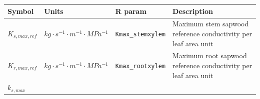 \documentclass[]{book}
\begin{document}
\begin{longtable}[]{@{}llll@{}}
\toprule
\begin{minipage}[b]{0.11\columnwidth}\raggedright\strut
Symbol\strut
\end{minipage} & \begin{minipage}[b]{0.10\columnwidth}\raggedright\strut
Units\strut
\end{minipage} & \begin{minipage}[b]{0.12\columnwidth}\raggedright\strut
R param\strut
\end{minipage} & \begin{minipage}[b]{0.45\columnwidth}\raggedright\strut
Description\strut
\end{minipage}\tabularnewline
\midrule
\endhead
\begin{minipage}[t]{0.11\columnwidth}\raggedright\strut
\(K_{s,max,ref}\)\strut
\end{minipage} & \begin{minipage}[t]{0.10\columnwidth}\raggedright\strut
\(kg \cdot s^{-1} \cdot m^{-1} \cdot MPa^{-1}\)\strut
\end{minipage} & \begin{minipage}[t]{0.12\columnwidth}\raggedright\strut
\texttt{Kmax\_stemxylem}\strut
\end{minipage} & \begin{minipage}[t]{0.45\columnwidth}\raggedright\strut
Maximum stem sapwood reference conductivity per leaf area unit\strut
\end{minipage}\tabularnewline
\begin{minipage}[t]{0.11\columnwidth}\raggedright\strut
\(K_{r,max,ref}\)\strut
\end{minipage} & \begin{minipage}[t]{0.10\columnwidth}\raggedright\strut
\(kg \cdot s^{-1} \cdot m^{-1} \cdot MPa^{-1}\)\strut
\end{minipage} & \begin{minipage}[t]{0.12\columnwidth}\raggedright\strut
\texttt{Kmax\_rootxylem}\strut
\end{minipage} & \begin{minipage}[t]{0.45\columnwidth}\raggedright\strut
Maximum root sapwood reference conductivity per leaf area unit\strut
\end{minipage}\tabularnewline
\begin{minipage}[t]{0.11\columnwidth}\raggedright\strut
\(k_{s, max}\)\strut
\end{minipage} & \begin{minipage}[t]{0.10\columnwidth}\raggedright\strut

\end{minipage}
\end{longtable}
\end{document}
